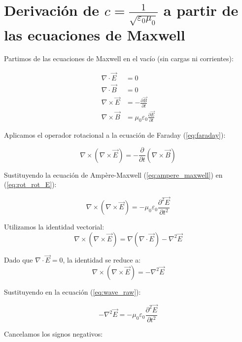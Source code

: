 \section*{Derivación de $c = \frac{1}{\sqrt{\varepsilon_0 \mu_0}}$ a partir de las ecuaciones de Maxwell}

Partimos de las ecuaciones de Maxwell en el vacío (sin cargas ni corrientes):

\begin{align}
	\nabla \cdot \vec{E} &= 0 \label{eq:gauss_electric}\\
	\nabla \cdot \vec{B} &= 0 \label{eq:gauss_magnetic}\\
	\nabla \times \vec{E} &= -\frac{\partial \vec{B}}{\partial t} \label{eq:faraday}\\
	\nabla \times \vec{B} &= \mu_0 \varepsilon_0 \frac{\partial \vec{E}}{\partial t} \label{eq:ampere_maxwell}
\end{align}

Aplicamos el operador rotacional a la ecuación de Faraday (\ref{eq:faraday}):

\begin{equation}
	\nabla \times (\nabla \times \vec{E}) = -\frac{\partial}{\partial t} (\nabla \times \vec{B}) \label{eq:rot_rot_E}
\end{equation}

Sustituyendo la ecuación de Ampère-Maxwell (\ref{eq:ampere_maxwell}) en (\ref{eq:rot_rot_E}):

\begin{equation}
	\nabla \times (\nabla \times \vec{E}) = -\mu_0 \varepsilon_0 \frac{\partial^2 \vec{E}}{\partial t^2} \label{eq:wave_raw}
\end{equation}

Utilizamos la identidad vectorial:
\[
\nabla \times (\nabla \times \vec{E}) = \nabla(\nabla \cdot \vec{E}) - \nabla^2 \vec{E}
\]

Dado que \( \nabla \cdot \vec{E} = 0 \), la identidad se reduce a:
\begin{equation}
	\nabla \times (\nabla \times \vec{E}) = -\nabla^2 \vec{E} \label{eq:vector_identity}
\end{equation}

Sustituyendo en la ecuación (\ref{eq:wave_raw}):

\begin{equation}
	-\nabla^2 \vec{E} = -\mu_0 \varepsilon_0 \frac{\partial^2 \vec{E}}{\partial t^2}
\end{equation}

Cancelamos los signos negativos:

